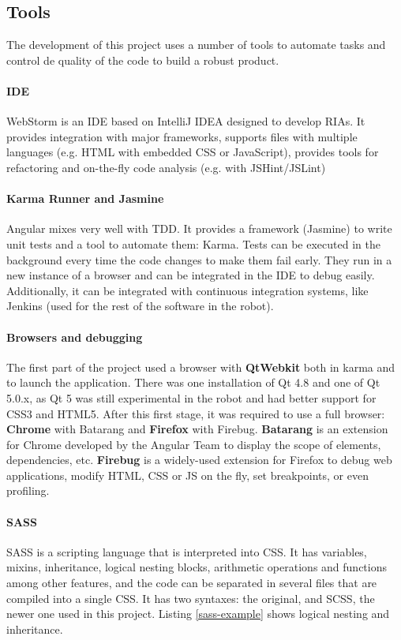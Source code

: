 \subsection{Tools}
The development of this project uses a number of tools to automate tasks and control de quality of the code to build a robust product.

\paragraph{\ac{IDE}} WebStorm is an \ac{IDE} based on IntelliJ IDEA designed to develop \acp{RIA}.
It provides integration with major frameworks, supports files with multiple languages (e.g. HTML with embedded \ac{CSS} or JavaScript), provides tools for refactoring and on-the-fly code analysis (e.g. with JSHint/JSLint)

\paragraph{Karma Runner and Jasmine} Angular mixes very well with \ac{TDD}. 
It provides a framework (Jasmine) to write unit tests and a tool to automate them: Karma.
Tests can be executed in the background every time the code changes to make them fail early.
They run in a new instance of a browser and can be integrated in the \ac{IDE} to debug easily.
Additionally, it can be integrated with continuous integration systems, like Jenkins (used for the rest of the software in the robot).

\paragraph{Browsers and debugging} The first part of the project used a browser with \textbf{QtWebkit} both in karma and to launch the application.
There was one installation of Qt 4.8 and one of Qt 5.0.x, as Qt 5 was still experimental in the robot and had better support for \ac{CSS3} and \ac{HTML5}.
After this first stage, it was required to use a full browser: \textbf{Chrome} with Batarang and \textbf{Firefox} with Firebug.
\textbf{Batarang} is an extension for Chrome developed by the Angular Team to display the scope of elements, dependencies, etc.
\textbf{Firebug} is a widely-used extension for Firefox to debug web applications, modify \ac{HTML}, \ac{CSS} or \ac{JS} on the fly, set breakpoints, or even profiling.

\paragraph{SASS} \ac{SASS} is a scripting language that is interpreted into \ac{CSS}.
It has variables, mixins, inheritance, logical nesting blocks, arithmetic operations and functions among other features, and the code can be separated in several files that are compiled into a single \ac{CSS}.
It has two syntaxes: the original, and \ac{SCSS}, the newer one used in this project.
Listing \ref{sass-example} shows logical nesting and inheritance.

